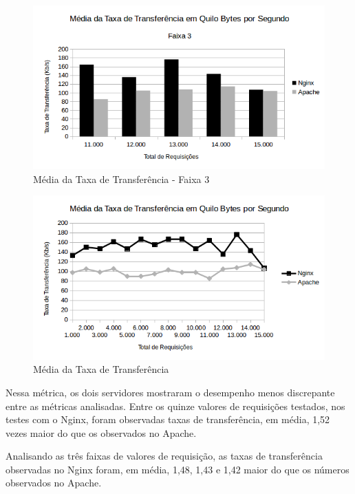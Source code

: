 \begin{figure}[H]
	\centering
	\includegraphics[width=1\linewidth]{graficos/grafico6-f3} 
	\caption{Média da Taxa de Transferência - Faixa 3}
	\label{fig:grafico6-f3}
\end{figure}

\begin{figure}[H]
	\centering
	\includegraphics[width=1\linewidth]{graficos/grafico6} 
	\caption{Média da Taxa de Transferência}
	\label{fig:grafico6}
\end{figure}

Nessa métrica, os dois servidores mostraram o desempenho menos discrepante 
entre as métricas analisadas. Entre os quinze valores de requisições testados, 
nos testes com o Nginx, foram observadas taxas de transferência, em média, 1,52 
vezes maior do que os observados no Apache.

Analisando as três faixas de valores de requisição, as taxas de transferência 
observadas no Nginx foram, em média, 1,48, 1,43 e 1,42 maior do que os números 
observados no Apache.